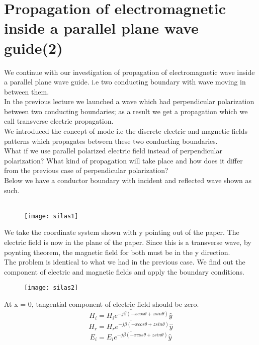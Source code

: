 \chapter{Propagation of electromagnetic inside  a parallel plane wave guide(2)}
We continue with our investigation of propagation of electromagnetic wave inside a parallel plane wave guide. i.e two conducting boundary with wave moving in between them.\\
In the previous lecture we launched a wave which had perpendicular polarization between two conducting boundaries; as a result we get a propagation which we call transverse electric propagation. \\
We introduced the concept of mode i.e the discrete electric and magnetic fields patterns which propagates between these two conducting boundaries.\\ What if we use parallel polarized electric field instead of perpendicular polarization? What kind of propagation will take place and how does it differ from the previous case of perpendicular polarization?\\ Below we have a conductor boundary with incident and reflected wave shown as such.\\
\\ 
\begin{figure}[h]
	\centering
	\texttt{[image: silas1]}
	\caption{}
\end{figure}
We take the coordinate system shown with y pointing out of the paper. The electric field is now in the plane of the paper. Since this is a transverse wave, by poynting theorem, the magnetic field for both must be in the y direction. \\
The problem is identical to what we had in the previous case. We find out the component of electric and magnetic fields and apply the boundary conditions.\\
\begin{figure}[h]
	\centering
	\texttt{[image: silas2]}
	\caption{}
\end{figure}
At x = 0, tangential component of electric field should be zero.
\begin{equation*}
\bar{H_{i} = H_{i} e^{-j\beta(-xcos\theta + zsin\theta)} \hat{y}}
\end{equation*}
\begin{equation*}
\bar{H_{r} = H_{r} e^{-j\beta(-xcos\theta + zsin\theta)} \hat{y}}
\end{equation*}
\begin{equation*}
\bar{E_{i} = E_{i} e^{-j\beta(-xcos\theta + zsin\theta)} \hat{y}}
\end{equation*}
